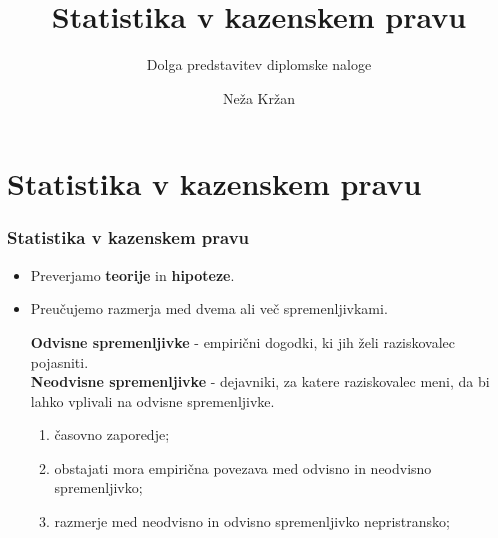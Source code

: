 \documentclass{beamer}
\begin{document}
\title{Statistika v kazenskem pravu}
\subtitle{Dolga predstavitev diplomske naloge}
\author[Neža Kržan]{Neža Kržan}
 
\date[5. maj 2023] {}

\subject{Talks}

\begin{frame}
   \titlepage
\end{frame}


\section{Statistika v kazenskem pravu}

\begin{frame}
    \frametitle{Statistika v kazenskem pravu}
    \begin{itemize}
        \item Preverjamo \textbf{teorije} in \textbf{hipoteze}.
        \item Preučujemo razmerja med dvema ali več spremenljivkami.\\ \vspace{2mm}
        \begin{block}{}
            \textbf{Odvisne spremenljivke} - empirični dogodki, ki jih želi raziskovalec pojasniti.\\
            \textbf{Neodvisne spremenljivke} - dejavniki, za katere raziskovalec meni, da bi lahko vplivali na odvisne spremenljivke.
        \end{block}
        \begin{enumerate}
            \item časovno zaporedje;
            \item obstajati mora empirična povezava med odvisno in neodvisno spremenljivko;
            \item razmerje med neodvisno in odvisno spremenljivko nepristransko;
        \end{enumerate}
    \end{itemize}
\end{frame}
\end{document}
